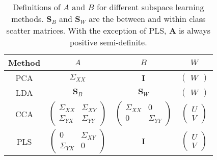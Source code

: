 \begin{table}[h]
    \centering
    \begin{tabular}{|c|c|c|c|}
        \hline
        Method & $A$                                                                                    & $B$                                                                & $W$                                    \\
        \hline
        PCA    & $\Sigma_{XX}$                                                                          & $\mathbf{I}$                                                       & $\begin{pmatrix}W\end{pmatrix}$        \\
        \hline
        LDA    & $\mathbf{S}_B$                                                                         & $\mathbf{S}_W$                                                     & $\begin{pmatrix}W\end{pmatrix}$        \\
        \hline
        CCA    & $\begin{pmatrix} \Sigma_{XX} & \Sigma_{XY} \\ \Sigma_{YX} & \Sigma_{YY} \end{pmatrix}$ & $\begin{pmatrix} \Sigma_{XX} & 0 \\ 0 & \Sigma_{YY} \end{pmatrix}$ & $\begin{pmatrix} U \\ V \end{pmatrix}$ \\
        \hline
        PLS    & $\begin{pmatrix} 0 & \Sigma_{XY} \\ \Sigma_{YX} & 0 \end{pmatrix}$                     & $\mathbf{I}$                                                       & $\begin{pmatrix} U \\ V \end{pmatrix}$ \\
        \hline
    \end{tabular}
    \caption{Definitions of $A$ and $B$ for different subspace learning methods. $\mathbf{S}_B$ and $\mathbf{S}_W$ are the between and within class scatter matrices. With the exception of PLS, $\textbf{A}$ is always positive semi-definite.}
    \label{tab:subspace}
\end{table}


